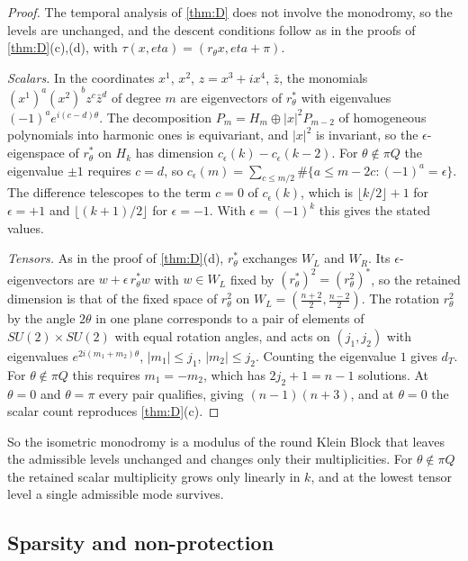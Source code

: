 \documentclass[11pt]{article}
\theoremstyle{canonmath}
\theoremstyle{canonpostulate}
\theoremstyle{canonproposition}
\theoremstyle{canonmath}
\theoremstyle{canonproposition}
\def\mathbb#1{#1}%
\def\eta{eta}%
\begin{document}
\begin{proof}
The temporal analysis of \cref{thm:D} does not involve the monodromy, so the levels are unchanged, and the descent conditions follow as in the proofs of \cref{thm:D}(c),(d), with $\tau(x,\eta) = (r_\theta x,\eta+\pi)$.

\emph{Scalars.} In the coordinates $x^1$, $x^2$, $z = x^3+ix^4$, $\bar z$, the monomials $(x^1)^a(x^2)^bz^c\bar z^d$ of degree $m$ are eigenvectors of $r_\theta^*$ with eigenvalues $(-1)^ae^{i(c-d)\theta}$. The decomposition $P_m = H_m\oplus|x|^2P_{m-2}$ of homogeneous polynomials into harmonic ones is equivariant, and $|x|^2$ is invariant, so the $\epsilon$-eigenspace of $r_\theta^*$ on $H_k$ has dimension $c_\epsilon(k) - c_\epsilon(k-2)$. For $\theta\notin\pi\mathbb{Q}$ the eigenvalue $\pm1$ requires $c = d$, so $c_\epsilon(m) = \sum_{c\le m/2}\#\{a\le m-2c : (-1)^a = \epsilon\}$. The difference telescopes to the term $c = 0$ of $c_\epsilon(k)$, which is $\lfloor k/2\rfloor+1$ for $\epsilon = +1$ and $\lfloor(k+1)/2\rfloor$ for $\epsilon = -1$. With $\epsilon = (-1)^k$ this gives the stated values.

\emph{Tensors.} As in the proof of \cref{thm:D}(d), $r_\theta^*$ exchanges $W_L$ and $W_R$. Its $\epsilon$-eigenvectors are $w + \epsilon\,r_\theta^*w$ with $w\in W_L$ fixed by $(r_\theta^*)^2 = (r_\theta^2)^*$, so the retained dimension is that of the fixed space of $r_\theta^2$ on $W_L = (\tfrac{n+2}2,\tfrac{n-2}2)$. The rotation $r_\theta^2$ by the angle $2\theta$ in one plane corresponds to a pair of elements of $SU(2)\times SU(2)$ with equal rotation angles, and acts on $(j_1,j_2)$ with eigenvalues $e^{2i(m_1+m_2)\theta}$, $|m_1|\le j_1$, $|m_2|\le j_2$. Counting the eigenvalue $1$ gives $d_T$. For $\theta\notin\pi\mathbb{Q}$ this requires $m_1 = -m_2$, which has $2j_2+1 = n-1$ solutions. At $\theta = 0$ and $\theta = \pi$ every pair qualifies, giving $(n-1)(n+3)$, and at $\theta = 0$ the scalar count reproduces \cref{thm:D}(c).
\end{proof}

So the isometric monodromy is a modulus of the round Klein Block that leaves the admissible levels unchanged and changes only their multiplicities. For $\theta\notin\pi\mathbb{Q}$ the retained scalar multiplicity grows only linearly in $k$, and at the lowest tensor level a single admissible mode survives.

\subsection{Sparsity and non-protection}
\end{document}

